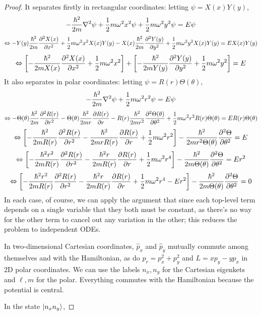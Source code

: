 \documentclass{article}
\begin{document}
\begin{proof}
  It separates firstly in rectangular coordinates: letting $\psi = X(x)Y(y)$,
  \[
    -\frac{\hbar^{2}}{2m}\laplacian\psi + \frac{1}{2}m\omega^{2}x^{2}\psi + \frac{1}{2}m\omega^{2}y^{2}\psi = E\psi
  \]
  \[
    \Leftrightarrow - Y(y)\frac{\hbar^{2}}{2m}\pdv[2]{X(x)}{x} + \frac{1}{2}m\omega^{2}x^{2}X(x)Y(y) - X(x)\frac{\hbar^{2}}{2m}\pdv[2]{Y(y)}{y}
    + \frac{1}{2}m\omega^{2}y^{2}X(x)Y(y) = EX(x)Y(y)
  \]
  \[
    \Leftrightarrow \qty[-\frac{\hbar^{2}}{2mX(x)}\pdv[2]{X(x)}{x} + \frac{1}{2}m\omega^{2}x^{2}]
    + \qty[-\frac{\hbar^{2}}{2mY(y)}\pdv[2]{Y(y)}{y} + \frac{1}{2}m\omega^{2}y^{2}] = E
  \]
  It also separates in polar coordinates: letting $\psi = R(r)\Theta(\theta)$,
  \[
    -\frac{\hbar^{2}}{2m}\laplacian\psi + \frac{1}{2}m\omega^{2}r^{2}\psi = E\psi
  \]
  \[
    \Leftrightarrow -\Theta(\theta)\frac{\hbar^{2}}{2m}\pdv[2]{R(r)}{r} - \Theta(\theta)\frac{\hbar^{2}}{2mr}\pdv{R(r)}{r}
    - R(r)\frac{\hbar^{2}}{2mr^{2}}\pdv[2]{\Theta(\theta)}{\theta} + \frac{1}{2}m\omega^{2}r^{2}R(r)\Theta(\theta) = ER(r)\Theta(\theta)
  \]
  \[
    \Leftrightarrow \qty[-\frac{\hbar^{2}}{2mR(r)}\pdv[2]{R(r)}{r} - \frac{\hbar^{2}}{2mrR(r)}\pdv{R(r)}{r} + \frac{1}{2}m\omega^{2}r^{2}]
    - \frac{\hbar^{2}}{2mr^{2}\Theta(\theta)}\pdv[2]{\Theta}{\theta} = E
  \]
  \[
    \Leftrightarrow \qty[-\frac{\hbar^{2}r^{2}}{2mR(r)}\pdv[2]{R(r)}{r} - \frac{\hbar^{2}r}{2mR(r)}\pdv{R(r)}{r} + \frac{1}{2}m\omega^{2}r^{4}]
    - \frac{\hbar^{2}}{2m\Theta(\theta)}\pdv[2]{\Theta}{\theta} = Er^{2}
  \]
  \[
    \Leftrightarrow \qty[-\frac{\hbar^{2}r^{2}}{2mR(r)}\pdv[2]{R(r)}{r} - \frac{\hbar^{2}r}{2mR(r)}\pdv{R(r)}{r} + \frac{1}{2}m\omega^{2}r^{4}
    - Er^{2}]
    - \frac{\hbar^{2}}{2m\Theta(\theta)}\pdv[2]{\Theta}{\theta} = 0
  \]
  In each case, of course, we can apply the argument that since each top-level term depends on a single variable that they both must be constant,
  as there's no way for the other term to cancel out any variation in the other; this reduces the problem to independent ODEs.

  In two-dimensional Cartesian coordinates, $\hat{p}_{x}$ and $\hat{p}_{y}$ mutually commute among themselves and with the Hamiltonian,
  as do $p_{r} = p_{x}^{2} + p_{y}^{2}$ and $L = xp_{y} - yp_{x}$ in 2D polar coordinates.
  We can use the labels $n_{x}, n_{y}$ for the Cartesian eigenkets and $\ell, m$ for the polar.
  Everything commutes with the Hamiltonian because the potential is central.

  In the state $\ket{n_{x}n_{y}}$, %
\end{proof}
\end{document}
